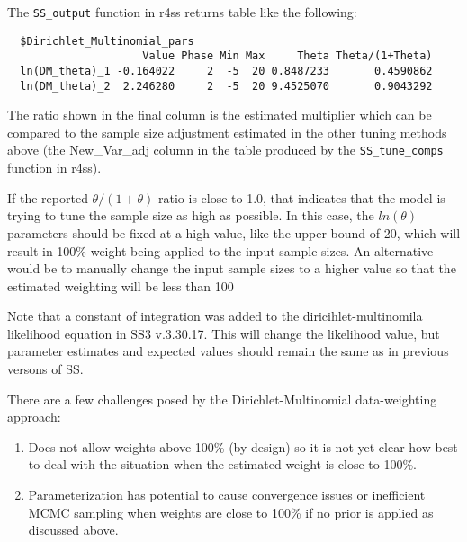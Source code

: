 The \texttt{SS\_output} function in r4ss returns table like the following:
\begin{small}
\begin{verbatim}
  $Dirichlet_Multinomial_pars
                     Value Phase Min Max     Theta Theta/(1+Theta)
  ln(DM_theta)_1 -0.164022     2  -5  20 0.8487233       0.4590862
  ln(DM_theta)_2  2.246280     2  -5  20 9.4525070       0.9043292
\end{verbatim}
\end{small}


The ratio shown in the final column is the estimated multiplier which can be compared to the sample size adjustment estimated in the other tuning methods above (the New\_Var\_adj column in the table produced by the \texttt{SS\_tune\_comps} function in r4ss).

If the reported $\theta/(1+\theta)$ ratio is close to 1.0, that indicates that the model is trying to tune the sample size as high as possible. In this case, the $ln(\theta)$ parameters should be fixed at a high value, like the upper bound of 20, which will result in 100\% weight being applied to the input sample sizes. An alternative would be to manually change the input sample sizes to a higher value so that the estimated weighting will be less than 100%

Note that a constant of integration was added to the diricihlet-multinomila likelihood equation in SS3 v.3.30.17. This will change the likelihood value, but parameter estimates and expected values should remain the same as in previous versons of SS.

There are a few challenges posed by the Dirichlet-Multinomial data-weighting approach:
\begin{enumerate}
	\item Does not allow weights above 100\% (by design) so it is not yet clear how best to deal with the situation when the estimated weight is close to 100\%.
	
	\item Parameterization has potential to cause convergence issues or inefficient MCMC sampling when weights are close to 100\% if no prior is applied as discussed above.
\end{enumerate}